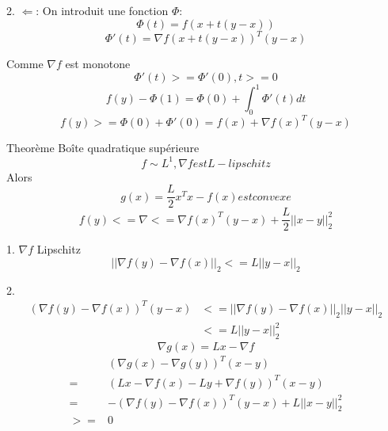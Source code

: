 \documentclass{article}
\begin{document}
2. $\Leftarrow$:
On introduit une fonction $\Phi$:
\begin{equation}
\Phi(t)=f(x+t(y-x))
\end{equation}
\begin{equation}
\Phi'(t)=\nabla f(x+t(y-x))^T(y-x)
\end{equation}

Comme $\nabla f$ est monotone
\begin{equation}
\Phi'(t)>=\Phi'(0), t>=0
\end{equation}
\begin{equation}
f(y)-\Phi(1)=\Phi(0)+\int_0^1\Phi'(t)dt
\end{equation}
\begin{equation}
f(y)>=\Phi(0)+\Phi'(0)=f(x)+\nabla f(x)^T(y-x)
\end{equation}

Theor\`eme Bo\^ite quadratique sup\'erieure
\begin{equation}
f\sim L^1,\nabla f est L-lipschitz
\end{equation}
Alors
\begin{equation}
g(x)=\frac{L}{2}x^Tx-f(x) est convexe
\end{equation}
\begin{equation}
f(y)<=\nabla <=\nabla f(x)^T(y-x)+\frac{L}{2}||x-y||_2^2
\end{equation}

1. $\nabla f$ Lipschitz
\begin{equation}
||\nabla f(y)-\nabla f(x)||_2 <= L||y-x||_2
\end{equation}

2. 
\begin{equation}
\begin{split}
(\nabla f(y)-\nabla f(x))^T(y-x)&<=||\nabla f(y)-\nabla f(x)||_2||y-x||_2\\
&<=L||y-x||_2^2
\end{split}
\end{equation}
\begin{equation}
\nabla g(x)=Lx-\nabla f
\end{equation}
\begin{equation}
\begin{split}
&(\nabla g(x)-\nabla g(y))^T(x-y)\\
=&(Lx-\nabla f(x)-Ly+\nabla f(y))^T(x-y)\\
=&-(\nabla f(y)-\nabla f(x))^T(y-x)+L||x-y||_2^2\\
>=&0
\end{split}
\end{equation}
\end{document}
